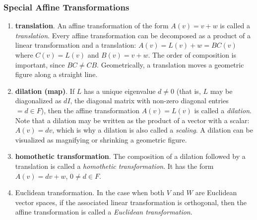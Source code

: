 \documentclass[12pt]{article}
\begin{document}
\subsubsection*{Special Affine Transformations}  
\begin{enumerate}
\item \textbf{translation}.  
An affine transformation of the form $A(v)=v+w$ is called a \emph{translation}.   Every affine transformation can be decomposed as a product of a linear transformation and a translation: $A(v)=L(v)+w=BC(v)$ where $C(v)=L(v)$ and $B(v)=v+w$.  The order of composition is important, since $BC\neq CB$.  Geometrically, a translation moves a geometric figure along a straight line.
\item \textbf{dilation (map)}.  
If $L$ has a unique eigenvalue $d\neq 0$ (that is, $L$ may be diagonalized as $dI$, the diagonal matrix with non-zero diagonal entries $=d\in F$), then the affine transformation $A(v)=L(v)$ is called a \emph{dilation}.  Note that a dilation may be written as the product of a vector with a scalar: $A(v)=dv$, which is why a dilation is also called a \emph{scaling}.  A dilation can be visualized as magnifying or shrinking a geometric figure.
\item \textbf{homothetic transformation}.  
The composition of a dilation followed by a translation is called a \emph{homothetic transformation}.  It has the form $A(v)=dv+w$, $0\neq d\in F$.
\item Euclidean transformation.  In the case when both $V$ and $W$ are Euclidean vector spaces, if the associated linear transformation is orthogonal, then the affine transformation is called a \emph{Euclidean transformation}.
\end{enumerate}
\end{document}
